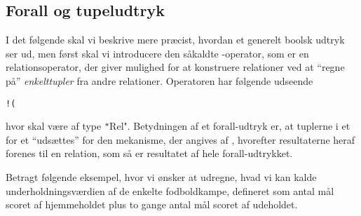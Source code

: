 \documentclass{article}
\newcounter{eks}
\begin{document}
\subsection{Forall og tupeludtryk}
I det f\o{}lgende skal vi beskrive mere pr\ae{}cist, hvordan et generelt
boolsk udtryk ser ud, men f\o{}rst skal vi introducere den
s\aa{}kaldte {\em {}}-operator, som er en relationsoperator, der
giver mulighed for at konstruere relationer ved at ``regne p\aa{}''
{\em enkelttupler\/} fra andre relationer. Operatoren har f\o{}lgende
udseende
\begin{center}
{\tt !(} 
\end{center}
hvor  skal v\ae{}re af type \texttt"Rel". Betydningen af
et forall-udtryk er, at tuplerne i  et for et
``uds\ae{}ttes'' for den mekanisme, der angives af ,
hvorefter resultaterne heraf forenes til en relation, som s\aa{} er
resultatet af hele forall-udtrykket.

Betragt f\o{}lgende eksempel, hvor vi \o{}nsker at udregne,
hvad vi kan kalde underholdningsv\ae{}rdien af de enkelte fodboldkampe,
defineret som antal m\aa{}l scoret af hjemmeholdet plus to gange
antal m\aa{}l scoret af udeholdet.
\end{document}
